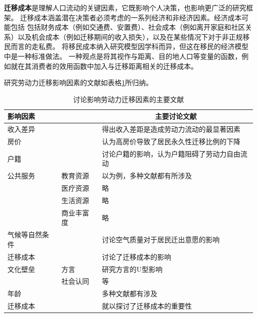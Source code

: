 \documentclass[a4paper,12pt,oneside, fontset=mac]{ctexbook} %
\begin{document}
\textbf{迁移成本}是理解人口流动的关键因素，它既影响个人决策，也影响更广泛的研究框架。
迁移成本涵盖潜在决策者必须考虑的一系列经济和非经济因素。经济成本可能包括
包括财务成本（例如交通费、安置费）、社会成本（例如离开家庭和社区关系）以及机会成本（例如迁移期间的收入损失），以及在某些情况下对于非正规移民而言的走私费。
将移民成本纳入研究模型因学科而异，但这在移民的经济模型中是一种标准做法。 
一种观点是将其视作与距离、目的地人口等变量的函数，例如\cite{LiuChenHuiLaoDongLiLiuDongJiNengPiPeiYuDiQuJingJiChaiJu2022}就在其消费者的效用函数中加入与迁移距离相关的迁移成本。


研究劳动力迁移影响因素的文献如表格\ref{tab:影响劳动力迁移的因素}所归纳。

\begin{table}[!ht]
\centering
\caption{讨论影响劳动力迁移因素的主要文献}
\begin{tabularx}{\textwidth}{@{}llX@{}}
\toprule
\textbf{影响因素} &  & \multicolumn{1}{c}{\textbf{主要讨论文献}} \\ 
\midrule
收入差异 &  &  \cite{kennanEffectExpectedIncome2011}得出收入差距是造成劳动力流动的最显著因素\\
房价 &  &  \cite{ZhangLiFangJieRuHeYingXiangLaoDongLiLiuDong2017}认为高房价导致了居民永久性迁移比例的下降\\
户籍 &  & \cite{ngaiChinasMobilityBarriers2019}讨论户籍的影响，认为户籍阻碍了劳动力自由流动\\
公共服务 &  教育资源&  以\cite{XiaYiRanChengShiJianDeMengMuSanQianGongGongFuWuYingXiangLaoDongLiLiuXiangDeJingYanYanJiu2015}为例，多种文献都有所涉及\\
  & 医疗资源 & 略\\
  & 生活资源 & 略\\
  & 商业丰富度 & 略\\
气候等自然条件 &  &  \cite{HongDaYongDiWeiChaiYiGuaYingXingYuJiXiaoQiDaiKongQiWuRanYouZhiDeJuMinQianChuYiXiangFenYiYanJiu2016}讨论空气质量对于居民迁出意愿的影响\\
迁移成本 &  &  \cite{WangLiLiWoGuoRenKouQianYiChengBenChengShiGuiMoYuShengChanLu2020}讨论了迁移成本的影响\\
文化壁垒 & 方言 &  \cite{LiuYuYunLaoDongLiKuaFangYanLiuDongDeDaoUXingMoShi2015}研究方言的U型影响\\
  & 社会认同 &  \cite{ZhangWenHongChengShiXinYiMinSheHuiRenTongDeJieGouMoXing2009}等\\
年龄 & & 多种文献都有涉及\\
迁移成本 & & \cite{todaroModelLaborMigration1969}就以探讨了迁移成本的重要性\\
\bottomrule
\end{tabularx}
\label{tab:影响劳动力迁移的因素}
\end{table}
\end{document}
